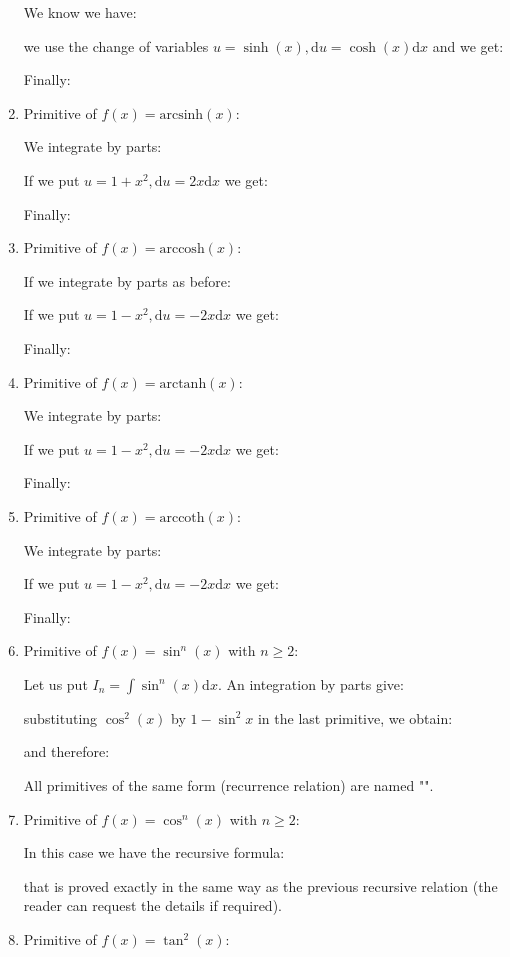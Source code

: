\begin{enumerate}
		We know we have:
		
		we use the change of variables $u=\sinh(x),\mathrm{d}u=\cosh(x)\mathrm{d}x$ and we get:
		
		Finally:
		
		\item Primitive of $f(x)=\text{arcsinh}(x)$:
		
		We integrate by parts:
		
		If we put $u=1+x^2,\mathrm{d}u=2x\mathrm{d}x$ we get:
		
		Finally:
		
		\item Primitive of $f(x)=\text{arccosh}(x)$:
		
		If we integrate by parts as before:
		
		If we put $u=1-x^2,\mathrm{d}u=-2x\mathrm{d}x$ we get:
		
		Finally:
		
		\item Primitive of $f(x)=\text{arctanh}(x)$:
		
		We integrate by parts:
		
		If we put $u=1-x^2,\mathrm{d}u=-2x\mathrm{d}x$ we get:
		
		Finally:
		
		\item Primitive of $f(x)=\text{arccoth}(x)$:
		
		We integrate by parts:
		
		If we put $u=1-x^2,\mathrm{d}u=-2x\mathrm{d}x$ we get:
		
		Finally:
		
		\item Primitive of $f(x)=\sin ^{n}(x)$ with $n \geq 2$:
		
		Let us put $I_n=\int \sin ^n(x)\mathrm{d}x$. An integration by parts give:
		
		substituting $\cos ^2(x)$ by $1-\sin ^2{x}$ in the last primitive, we obtain:
		
		and therefore:
		
		All primitives of the same form (recurrence relation) are named "".
		
		\item Primitive of $f(x)=\cos ^{n}(x)$ with $n \geq 2$:
		
		In this case we have the recursive formula:
		
		that is proved exactly in the same way as the previous recursive relation (the reader can request the details if required).
		\item Primitive of $f(x)=\tan ^{2}(x)$:
		

\end{enumerate}
